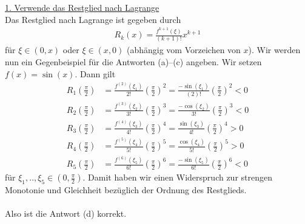 \underline{1. Verwende das Restglied nach Lagrange}\\
Das Restglied nach Lagrange ist gegeben durch
\begin{align*}
	R_k(x) 
	= 
	\frac{f^{k+1}(\xi)}{(k+1)!} x^{k+1}
\end{align*}
für $ \xi \in (0,x)$ oder $ \xi  \in (x, 0) $ (abhängig vom Vorzeichen von $ x $).
Wir werden nun ein Gegenbeispiel für die Antworten (a)--(c) angeben.
Wir setzen $ f(x)  = \sin(x)$. Dann gilt
\begin{align*}
	R_1\left(\frac{\pi}{2} \right)
	&=
	\frac{f^{(2)}(\xi_1)}{2!} \left( \frac{\pi}{2}  \right)^{2}
	=
	\frac{-\sin(\xi_1)}{(2)!} \left( \frac{\pi}{2}  \right)^{2} < 0\\
	R_2\left(\frac{\pi}{2} \right)
	&=
	\frac{f^{(3)}(\xi_2)}{3!} \left( \frac{\pi}{2}  \right)^{3}
	=
	\frac{-\cos(\xi_2)}{3!} \left( \frac{\pi}{2}  \right)^{3} < 0\\
	R_3\left(\frac{\pi}{2} \right)
	&=
	\frac{f^{(4)}(\xi_3)}{4!} \left( \frac{\pi}{2}  \right)^{4}
	=
	\frac{\sin (\xi_3)}{4!} \left( \frac{\pi}{2}  \right)^{4} > 0\\
	R_4\left(\frac{\pi}{2} \right)
	&=
	\frac{f^{(5)}(\xi_4)}{5!} \left( \frac{\pi}{2}  \right)^{5}
	=
	\frac{\cos (\xi_4)}{5!} \left( \frac{\pi}{2}  \right)^{5} > 0\\
	R_5\left(\frac{\pi}{2} \right)
	&=
	\frac{f^{(6)}(\xi_5)}{6!} \left( \frac{\pi}{2}  \right)^{6}
	=
	\frac{-\sin (\xi_5)}{6!} \left( \frac{\pi}{2}  \right)^{6} < 0
\end{align*}
für $ \xi_1,..,\xi_5 \in \left(0 , \frac{\pi}{2}\right) $.
Damit haben wir einen Widerspruch zur strengen Monotonie und Gleichheit bezüglich der Ordnung des Restglieds.\\
\\
Also ist die Antwort (d) korrekt.

\newpage
